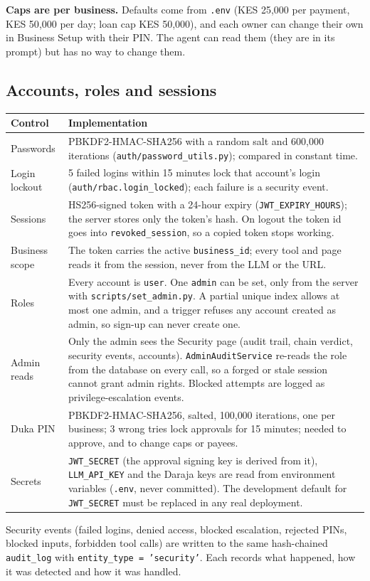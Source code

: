 \documentclass[10pt,a4paper]{article}
\newcommand{\code}[1]{\texttt{\small #1}}
\begin{document}
\textbf{Caps are per business.} Defaults come from \code{.env} (KES 25{,}000 per payment, KES 50{,}000 per day; loan cap KES 50{,}000), and each owner can change their own in Business Setup with their PIN. The agent can read them (they are in its prompt) but has no way to change them.

\subsection{Accounts, roles and sessions}
\label{sec:rbac}
\begin{center}
\begin{tabularx}{\textwidth}{@{}p{3.4cm}Y@{}}
\toprule
\textbf{Control} & \textbf{Implementation}\\
\midrule
Passwords & PBKDF2-HMAC-SHA256 with a random salt and 600{,}000 iterations (\code{auth/password\_utils.py}); compared in constant time.\\
Login lockout & 5 failed logins within 15 minutes lock that account's login (\code{auth/rbac.login\_locked}); each failure is a security event.\\
Sessions & HS256-signed token with a 24-hour expiry (\code{JWT\_EXPIRY\_HOURS}); the server stores only the token's hash. On logout the token id goes into \code{revoked\_session}, so a copied token stops working.\\
Business scope & The token carries the active \code{business\_id}; every tool and page reads it from the session, never from the LLM or the URL.\\
Roles & Every account is \code{user}. One \code{admin} can be set, only from the server with \code{scripts/set\_admin.py}. A partial unique index allows at most one admin, and a trigger refuses any account created as admin, so sign-up can never create one.\\
Admin reads & Only the admin sees the Security page (audit trail, chain verdict, security events, accounts). \code{AdminAuditService} re-reads the role from the database on every call, so a forged or stale session cannot grant admin rights. Blocked attempts are logged as privilege-escalation events.\\
Duka PIN & PBKDF2-HMAC-SHA256, salted, 100{,}000 iterations, one per business; 3 wrong tries lock approvals for 15 minutes; needed to approve, and to change caps or payees.\\
Secrets & \code{JWT\_SECRET} (the approval signing key is derived from it), \code{LLM\_API\_KEY} and the Daraja keys are read from environment variables (\code{.env}, never committed). The development default for \code{JWT\_SECRET} must be replaced in any real deployment.\\
\bottomrule
\end{tabularx}
\end{center}
Security events (failed logins, denied access, blocked escalation, rejected PINs, blocked inputs, forbidden tool calls) are written to the same hash-chained \code{audit\_log} with \code{entity\_type = 'security'}. Each records what happened, how it was detected and how it was handled.
\end{document}
